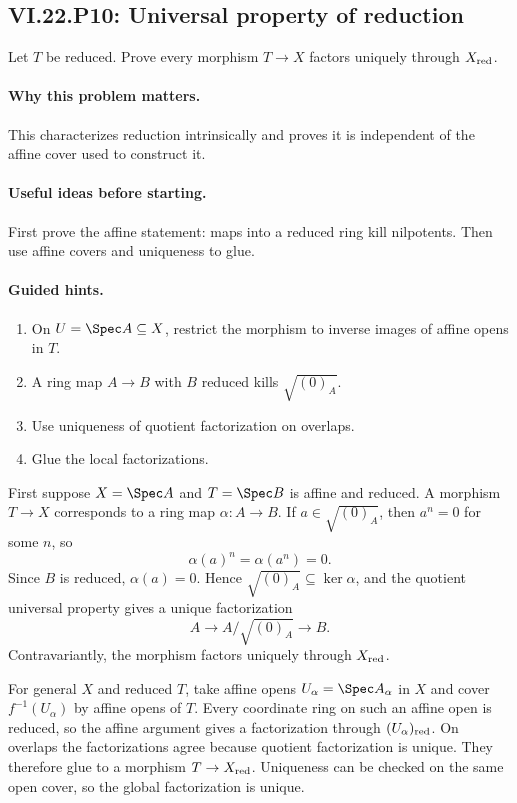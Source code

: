 \subsection*{VI.22.P10: Universal property of reduction}
\begin{problem}\label{prob:vi22-p10}
Let $T$ be reduced.  Prove every morphism $T\to X$ factors uniquely through $X_{\rm red}$.
\end{problem}

\ifdefined\FullProblemDossiers
\paragraph{Why this problem matters.}
This characterizes reduction intrinsically and proves it is independent of the affine cover used to construct it.

\paragraph{Useful ideas before starting.}
First prove the affine statement: maps into a reduced ring kill nilpotents.  Then use affine covers and uniqueness to glue.

\paragraph{Guided hints.}
\begin{enumerate}
\item On $U=\Spec A\subseteq X$, restrict the morphism to inverse images of affine opens in $T$.
\item A ring map $A\to B$ with $B$ reduced kills $\sqrt{(0)_A}$.
\item Use uniqueness of quotient factorization on overlaps.
\item Glue the local factorizations.
\end{enumerate}

\begin{solution}
First suppose $X=\Spec A$ and $T=\Spec B$ is affine and reduced.  A morphism
$T\to X$ corresponds to a ring map $\alpha:A\to B$.  If $a\in\sqrt{(0)_A}$, then
$a^n=0$ for some $n$, so
\[
 \alpha(a)^n=\alpha(a^n)=0.
\]
Since $B$ is reduced, $\alpha(a)=0$.  Hence $\sqrt{(0)_A}\subseteq\ker\alpha$, and the quotient
universal property gives a unique factorization
\[
 A\longrightarrow A/\sqrt{(0)_A}\longrightarrow B.
\]
Contravariantly, the morphism factors uniquely through $X_{\rm red}$.

For general $X$ and reduced $T$, take affine opens $U_\alpha=\Spec A_\alpha$ in $X$ and cover
$f^{-1}(U_\alpha)$ by affine opens of $T$.  Every coordinate ring on such an affine open is
reduced, so the affine argument gives a factorization through
$(U_\alpha)_{\rm red}$.  On overlaps the factorizations agree because quotient factorization
is unique.  They therefore glue to a morphism $T\to X_{\rm red}$.  Uniqueness can be checked
on the same open cover, so the global factorization is unique.
\end{solution}

